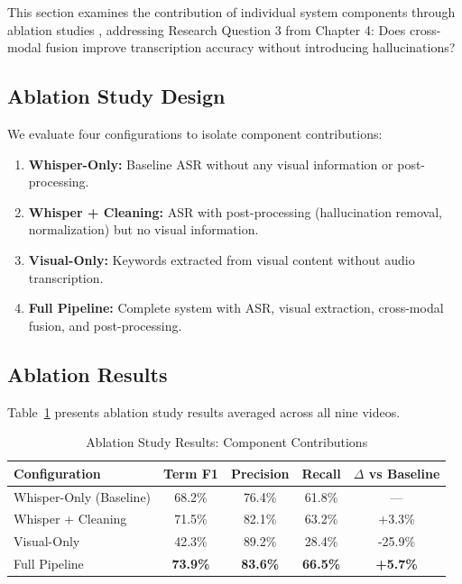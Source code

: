 This section examines the contribution of individual system components through ablation studies \cite{Montgomery2017}, addressing Research Question 3 from Chapter 4: Does cross-modal fusion improve transcription accuracy without introducing hallucinations?

\subsection{Ablation Study Design}

We evaluate four configurations to isolate component contributions:

\begin{enumerate}
    \item \textbf{Whisper-Only:} Baseline ASR without any visual information or post-processing.
    \item \textbf{Whisper + Cleaning:} ASR with post-processing (hallucination removal, normalization) but no visual information.
    \item \textbf{Visual-Only:} Keywords extracted from visual content without audio transcription.
    \item \textbf{Full Pipeline:} Complete system with ASR, visual extraction, cross-modal fusion, and post-processing.
\end{enumerate}

\subsection{Ablation Results}

Table~\ref{tab:ablation_results} presents ablation study results averaged across all nine videos.

\begin{table}[h]
\centering
\caption{Ablation Study Results: Component Contributions}
\label{tab:ablation_results}
\begin{tabular}{|l|c|c|c|c|}
\hline
\textbf{Configuration} & \textbf{Term F1} & \textbf{Precision} & \textbf{Recall} & \textbf{$\Delta$ vs Baseline} \\
\hline
Whisper-Only (Baseline) & 68.2\% & 76.4\% & 61.8\% & --- \\
\hline
Whisper + Cleaning & 71.5\% & 82.1\% & 63.2\% & +3.3\% \\
\hline
Visual-Only & 42.3\% & 89.2\% & 28.4\% & -25.9\% \\
\hline
Full Pipeline & \textbf{73.9\%} & \textbf{83.6\%} & \textbf{66.5\%} & \textbf{+5.7\%} \\
\hline
\end{tabular}
\end{table}

